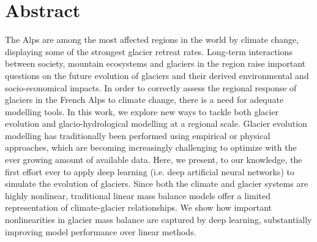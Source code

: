 
\section*{Abstract}

The Alps are among the most affected regions in the world by climate change, displaying some of the strongest glacier retreat rates. Long-term interactions between society, mountain ecosystems and glaciers in the region raise important questions on the future evolution of glaciers and their derived environmental and socio-economical  impacts. In order to correctly assess the regional response of glaciers in the French Alps to climate change, there is a need for adequate modelling tools. In this work, we explore new ways to tackle both glacier evolution and glacio-hydrological modelling at a regional scale. Glacier evolution modelling has traditionally been performed using empirical or physical approaches, which are becoming increasingly challenging to optimize with the ever growing amount of available data. Here, we present, to our knowledge, the first effort ever to apply deep learning (i.e. deep artificial neural networks) to simulate the evolution of glaciers. Since both the climate and glacier systems are highly nonlinear, traditional linear mass balance models offer a limited representation of climate-glacier relationships. We show how important nonlinearities in glacier mass balance are captured by deep learning, substantially improving model performance over linear methods. 

